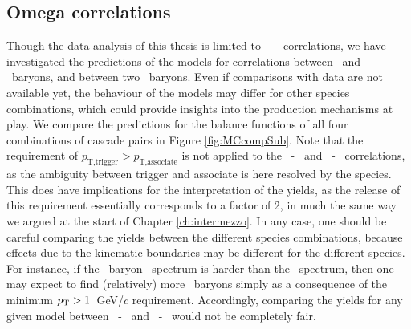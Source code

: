   \subsection{Omega correlations}

  Though the data analysis of this thesis is limited to \Xi\ - \Xi\ correlations, we have investigated the predictions of the models for correlations between \Xi\ and \Omega\ baryons, and between two \Omega\ baryons. Even if comparisons with data are not available yet, the behaviour of the models may differ for other species combinations, which could provide insights into the production mechanisms at play. We compare the predictions for the balance functions of all four combinations of cascade pairs in Figure \ref{fig:MCcompSub}. Note that the requirement of $p_\text{T,trigger} > p_\text{T,associate}$ is not applied to the \Xi\ - \Omega\ and \Omega\ - \Omega\ correlations, as the ambiguity between trigger and associate is here resolved by the species.
   This does have implications for the interpretation of the yields, as the release of this requirement essentially corresponds to a factor of 2, in much the same way we argued at the start of Chapter \ref{ch:intermezzo}. In any case, one should be careful comparing the yields between the different species combinations, because effects due to the kinematic boundaries may be different for the different species. For instance, if the \Omega\ baryon \pt\ spectrum is harder than the \Xi\ spectrum, then one may expect to find (relatively) more \Omega\ baryons simply as a consequence of the minimum $p_{\text{T}} > 1$~GeV/$c$ requirement. Accordingly, comparing the yields for any given model between \Xi\ - \Xi\ and \Xi\ - \Omega\ would not be completely fair.  
